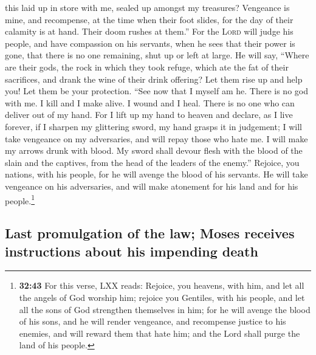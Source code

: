 this laid up in store with me, sealed up amongst my treasures?
 Vengeance is mine, and recompense, at the time when
their foot slides, for the day of their calamity is at hand. Their doom
rushes at them.''  For the \textsc{Lord} will judge his
people, and have compassion on his servants, when he sees that their
power is gone, that there is no one remaining, shut up or left at large.
 He will say, ``Where are their gods, the rock in which
they took refuge,  which ate the fat of their sacrifices,
and drank the wine of their drink offering? Let them rise up and help
you! Let them be your protection.  ``See now that I
myself am he. There is no god with me. I kill and I make alive. I wound
and I heal. There is no one who can deliver out of my hand.
 For I lift up my hand to heaven and declare, as I live
forever,  if I sharpen my glittering sword, my hand
grasps it in judgement; I will take vengeance on my adversaries, and
will repay those who hate me.  I will make my arrows
drunk with blood. My sword shall devour flesh with the blood of the
slain and the captives, from the head of the leaders of the enemy.''
 Rejoice, you nations, with his people, for he will
avenge the blood of his servants. He will take vengeance on his
adversaries, and will make atonement for his land and for his
people.\footnote{\textbf{32:43} For this verse, LXX reads: Rejoice, you
  heavens, with him, and let all the angels of God worship him; rejoice
  you Gentiles, with his people, and let all the sons of God strengthen
  themselves in him; for he will avenge the blood of his sons, and he
  will render vengeance, and recompense justice to his enemies, and will
  reward them that hate him; and the Lord shall purge the land of his
  people.}

\hypertarget{last-promulgation-of-the-law-moses-receives-instructions-about-his-impending-death}{%
\subsection{Last promulgation of the law; Moses receives instructions
about his impending
death}\label{last-promulgation-of-the-law-moses-receives-instructions-about-his-impending-death}}

